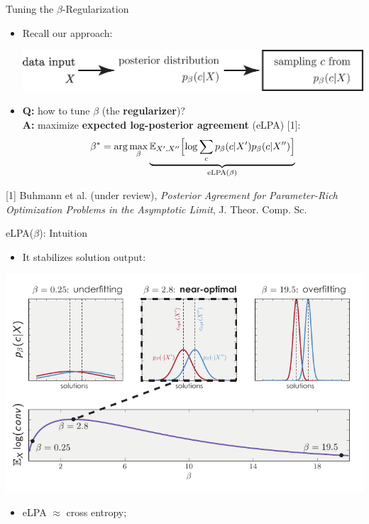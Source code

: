 \documentclass[presentation,12pt]{beamer}
\newcommand{\Expct}{\mathbb{E}}
\begin{document}
\begin{frame}{Tuning the $\beta$-Regularization}
\begin{itemize}
  \item Recall our approach:
  \begin{center}
    \hspace{-8mm}\includegraphics[scale=.4]{posterior-distribution-explanation} 
  \end{center}
  \vspace{.3cm}

  \item \textbf{Q:} how to tune $\beta$ (the \textbf{regularizer})? \\[.3cm] \textbf{A:} maximize \textbf{expected
  log-posterior agreement} (eLPA) [1]:
  \[
    \beta^* = \arg \max_\beta \underbrace{\Expct_{X',X''} \Bigl[
      \log \sum_c p_\beta(c|X') p_\beta(c|X'') 
    \Bigr]}_{\mathrm{eLPA}(\beta)}
  \]
\end{itemize}

{
  \textcolor{gray!60}{
    \scriptsize [1] Buhmann et al. (under review), 
    \textit{Posterior Agreement for Parameter-Rich Optimization Problems in the Asymptotic Limit}, J. Theor. Comp. Sc. 
  }\par
}

\end{frame}

\begin{frame}{eLPA($\beta$): Intuition}
  
  \begin{itemize}
    \item It stabilizes solution output:
  \end{itemize}

  \vspace{-3mm}
  \centering\includegraphics[scale=.85]{expected-conv-intuition.pdf}

  \begin{itemize}
    \item eLPA $\approx$ cross entropy;
  \end{itemize}
\end{frame}
\end{document}
